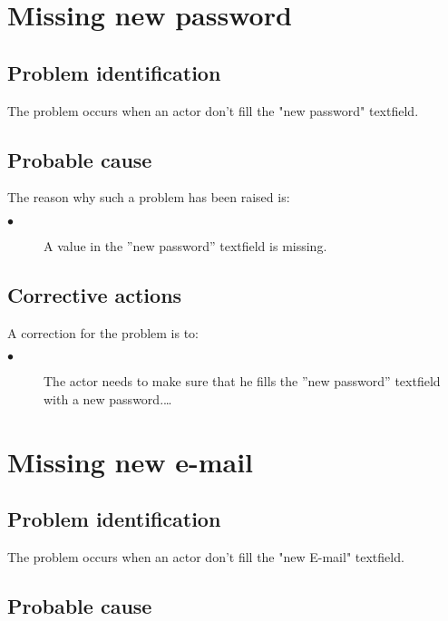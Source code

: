 \section{Missing new password} 

\subsection{Problem identification}
The problem occurs when an actor don't fill the "new password" textfield.

\subsection{Probable cause}

The reason why such a problem has been raised is:\\
\begin{description}
\item[$\bullet$] A value in the ''new password'' textfield is missing.
\end{description}


\subsection{Corrective actions}

A correction for the problem is to:\\
\begin{description}
\item[$\bullet$] The actor needs to make sure that he fills the
''new password'' textfield with a new password.\ldots

\end{description}




\section{Missing new e-mail} 

\subsection{Problem identification}
The problem occurs when an actor don't fill the "new E-mail" textfield.

\subsection{Probable cause}

